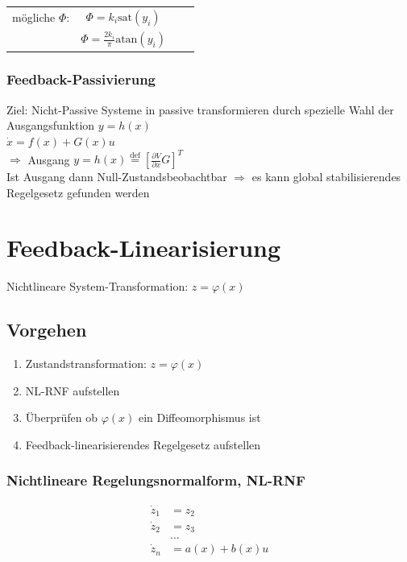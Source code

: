 \documentclass[german]{latex4ei/latex4ei_sheet}
\begin{document}
\begin{tabular}{cccc}
mögliche $\Phi$:  & $\Phi = k_i \text{sat}(y_i)$ & \\
                  & $\Phi = \frac{2 k_i}{\pi}\text{atan}(y_i)$ &
\end{tabular}

\subsubsection*{Feedback-Passivierung}
Ziel: Nicht-Passive Systeme in passive transformieren durch spezielle Wahl der Ausgangsfunktion $y=h(x)$ \\
$\dot{x} = f(x) + G(x)u$ \\
$\Rightarrow$ Ausgang $y = h(x) \overset{\text{def}}{=} \left[ \frac{\partial V}{\partial x} G \right]^T$ \\
Ist Ausgang dann Null-Zustandsbeobachtbar $\Rightarrow$ es kann global stabilisierendes Regelgesetz gefunden werden


\section{Feedback-Linearisierung}
Nichtlineare System-Transformation: $z = \varphi (x)$

\subsection{Vorgehen}
\begin{enumerate}
  \item Zustandstransformation: $z = \varphi(x)$
  \item NL-RNF aufstellen
  \item Überprüfen ob $\varphi(x)$ ein Diffeomorphismus ist
  \item Feedback-linearisierendes Regelgesetz aufstellen
\end{enumerate}

\subsubsection*{Nichtlineare Regelungsnormalform, NL-RNF}
\begin{align*}
  \dot{z}_1 &= z_2 \\
  \dot{z}_2 &= z_3 \\
            &\dots \\
  \dot{z}_n &= a(x) + b(x) u \\
\end{align*}
\end{document}
